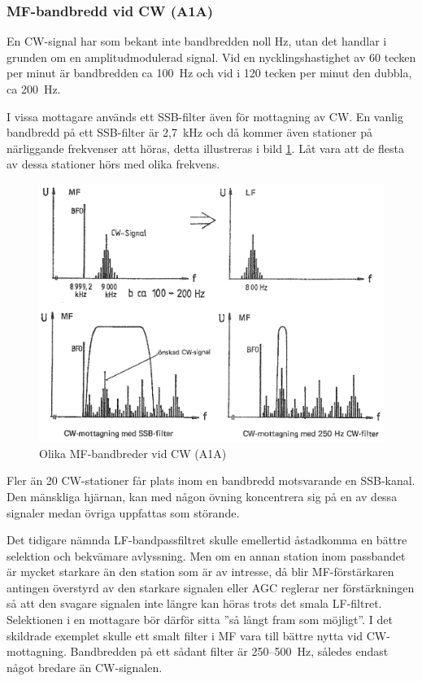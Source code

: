 \subsubsection{MF-bandbredd vid CW (A1A)}

En CW-signal har som bekant inte bandbredden noll Hz, utan det handlar
i grunden om en amplitudmodulerad signal.
Vid en nycklingshastighet av 60 tecken per minut är bandbredden ca 100~Hz
och vid i 120 tecken per minut den dubbla, ca 200~Hz.

I vissa mottagare används ett SSB-filter även för mottagning av CW.
En vanlig bandbredd på ett SSB-filter är 2,7~kHz och då kommer även
stationer på närliggande frekvenser att höras, detta illustreras i bild
\ref{fig:bildII4-28}.
Låt vara att de flesta av dessa stationer hörs med olika frekvens.

\begin{figure}
  \includegraphics[width=\textwidth]{images/cropped_pdfs/bild_2_4-28.pdf}
  \caption{Olika MF-bandbreder vid CW (A1A)}
  \label{fig:bildII4-28}
\end{figure}

Fler än 20 CW-stationer får plats inom en bandbredd motsvarande en SSB-kanal.
Den mänskliga hjärnan, kan med någon övning koncentrera sig på en av dessa
signaler medan övriga uppfattas som störande.

Det tidigare nämnda LF-bandpassfiltret skulle emellertid åstadkomma en
bättre selektion och bekvämare avlyssning.
Men om en annan station inom passbandet är mycket starkare än den station
som är av intresse, då blir MF-förstärkaren antingen överstyrd av den
starkare signalen eller AGC reglerar ner förstärkningen så att den svagare
signalen inte längre kan höras trots det smala LF-filtret.
Selektionen i en mottagare bör därför sitta ''så långt fram som möjligt''.
I det skildrade exemplet skulle ett smalt filter i MF vara till bättre nytta
vid CW-mottagning.
Bandbredden på ett sådant filter är 250--500~Hz, således endast något bredare
än CW-signalen.

